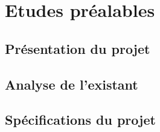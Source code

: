 \section{Etudes préalables}

\subsection{Présentation du projet}

\subsection{Analyse de l'existant}

\subsection{Spécifications du projet}

